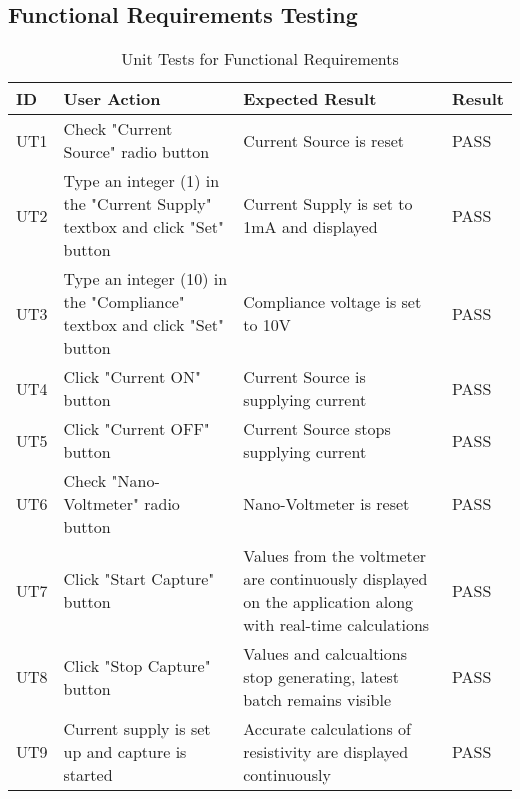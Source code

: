 \documentclass[12pt, titlepage]{article}
\begin{document}
\subsection{Functional Requirements Testing}

\begin{table}[H]
	\centering
	\caption{Unit Tests for Functional Requirements}
	\label{my-label}
	\begin{tabular}{|p{0.85cm}|p{5cm}|p{5cm}|p{1.3cm}|}
		\hline
		\textbf{ID} & \textbf{User Action} & \textbf{Expected Result}  & \textbf{Result}\\ \hline
		UT1 & Check "Current Source" radio button & Current Source is reset & PASS \\ \hline
		UT2 & Type an integer (1) in the "Current Supply" textbox and click "Set" button & Current Supply is set to 1mA and displayed & PASS \\ \hline
		UT3 & Type an integer (10) in the "Compliance" textbox and click "Set" button & Compliance voltage is set to 10V & PASS\\ \hline
		UT4 & Click "Current ON" button & Current Source is supplying current & PASS \\ \hline
		UT5 & Click "Current OFF" button & Current Source stops supplying current & PASS \\ \hline
		UT6 & Check "Nano-Voltmeter" radio button & Nano-Voltmeter is reset & PASS \\ \hline
		UT7 & Click "Start Capture" button & Values from the voltmeter are continuously displayed on the application along with real-time calculations & PASS  \\ \hline
		UT8 & Click "Stop Capture" button & Values and calcualtions stop generating, latest batch remains visible & PASS \\ \hline
		UT9 & Current supply is set up and capture is started & Accurate calculations of resistivity are displayed continuously & PASS \\ \hline
	\end{tabular}
\end{table}

\end{document}
